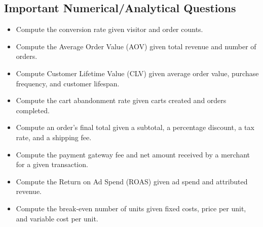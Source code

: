 \documentclass[11pt,a4paper]{article}
\begin{document}
\subsection{Important Numerical/Analytical Questions}
\begin{itemize}[leftmargin=*]
  \item Compute the conversion rate given visitor and order counts.
  \item Compute the Average Order Value (AOV) given total revenue and number of orders.
  \item Compute Customer Lifetime Value (CLV) given average order value, purchase frequency, and customer lifespan.
  \item Compute the cart abandonment rate given carts created and orders completed.
  \item Compute an order's final total given a subtotal, a percentage discount, a tax rate, and a shipping fee.
  \item Compute the payment gateway fee and net amount received by a merchant for a given transaction.
  \item Compute the Return on Ad Spend (ROAS) given ad spend and attributed revenue.
  \item Compute the break-even number of units given fixed costs, price per unit, and variable cost per unit.
\end{itemize}
\end{document}
